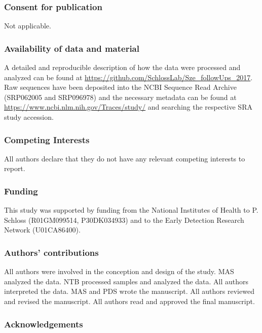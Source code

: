 \documentclass[12pt,]{article}
\begin{document}
\subsubsection{Consent for publication}\label{consent-for-publication}

Not applicable.

\subsubsection{Availability of data and
material}\label{availability-of-data-and-material}

A detailed and reproducible description of how the data were processed
and analyzed can be found at
\url{https://github.com/SchlossLab/Sze_followUps_2017}. Raw sequences
have been deposited into the NCBI Sequence Read Archive (SRP062005 and
SRP096978) and the necessary metadata can be found at
\url{https://www.ncbi.nlm.nih.gov/Traces/study/} and searching the
respective SRA study accession.

\subsubsection{Competing Interests}\label{competing-interests}

All authors declare that they do not have any relevant competing
interests to report.

\subsubsection{Funding}\label{funding}

This study was supported by funding from the National Institutes of
Health to P. Schloss (R01GM099514, P30DK034933) and to the Early
Detection Research Network (U01CA86400).

\subsubsection{Authors' contributions}\label{authors-contributions}

All authors were involved in the conception and design of the study. MAS
analyzed the data. NTB processed samples and analyzed the data. All
authors interpreted the data. MAS and PDS wrote the manuscript. All
authors reviewed and revised the manuscript. All authors read and
approved the final manuscript.

\subsubsection{Acknowledgements}\label{acknowledgements}
\end{document}
